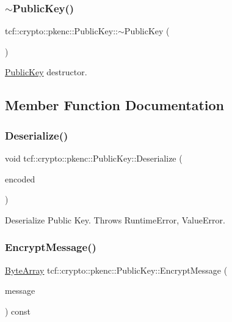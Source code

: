\subsubsection{\texorpdfstring{$\sim$\+Public\+Key()}{~PublicKey()}}
{\footnotesize\ttfamily tcf\+::crypto\+::pkenc\+::\+Public\+Key\+::$\sim$\+Public\+Key (\begin{DoxyParamCaption}{ }\end{DoxyParamCaption})}

\hyperlink{classtcf_1_1crypto_1_1pkenc_1_1PublicKey}{Public\+Key} destructor. 

\subsection{Member Function Documentation}
\mbox{\label{classtcf_1_1crypto_1_1pkenc_1_1PublicKey_ada0915154339efaaedc3487637f659eb}} 
\subsubsection{\texorpdfstring{Deserialize()}{Deserialize()}}
{\footnotesize\ttfamily void tcf\+::crypto\+::pkenc\+::\+Public\+Key\+::\+Deserialize (\begin{DoxyParamCaption}\item[{const std\+::string \&}]{encoded }\end{DoxyParamCaption})}

Deserialize Public Key. Throws Runtime\+Error, Value\+Error. \mbox{\label{classtcf_1_1crypto_1_1pkenc_1_1PublicKey_a31985a3c684b75d56539c50f3b1c4950}} 
\subsubsection{\texorpdfstring{Encrypt\+Message()}{EncryptMessage()}}
{\footnotesize\ttfamily \hyperlink{types_8h_a35da937e2331acce98d47f44892f4a76}{Byte\+Array} tcf\+::crypto\+::pkenc\+::\+Public\+Key\+::\+Encrypt\+Message (\begin{DoxyParamCaption}\item[{const \hyperlink{types_8h_a35da937e2331acce98d47f44892f4a76}{Byte\+Array} \&}]{message }\end{DoxyParamCaption}) const}

